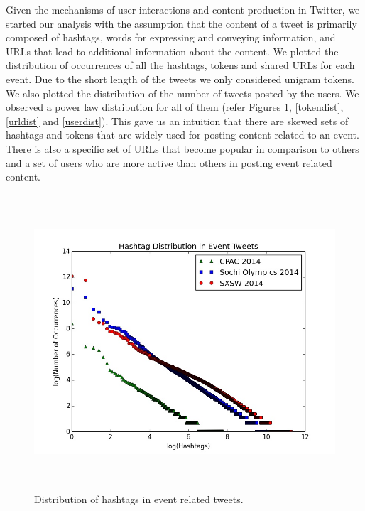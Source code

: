 Given the mechanisms of user interactions and content production in Twitter, we started our analysis with the assumption that the content of a tweet is primarily composed of hashtags, words for expressing and conveying information, and URLs that lead to additional information about the content. We plotted the distribution of occurrences of all the hashtags, tokens and shared URLs for each event. Due to the short length of the tweets we only considered unigram tokens. We also plotted the distribution of the number of tweets posted by the users.
We observed a power law distribution for all of them (refer Figures \ref{hashtagdist}, \ref{tokendist}, \ref{urldist} and \ref{userdist}). This gave us an intuition that there are skewed sets of hashtags and tokens that are widely used for posting content related to an event. 
There is also a specific set of URLs that become popular in comparison to others and a set of users who are more active than others in posting event related content. 

\begin{figure}[htbp]
  \caption{Distribution of hashtags in event related tweets.}
	\label{hashtagdist}
  \centering
    \includegraphics[width=14cm,height=11cm]{Figures/HashTagDistribution.jpeg}
\end{figure}

